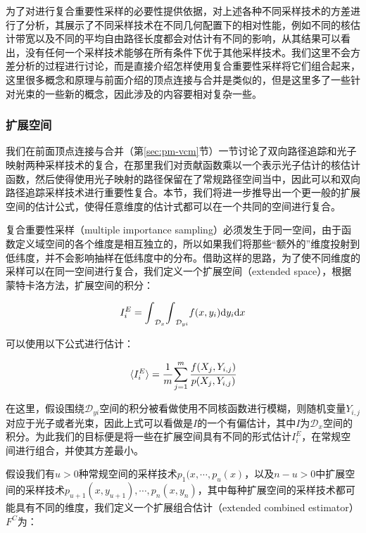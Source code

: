 为了对进行复合重要性采样的必要性提供依据，\cite{a:UnifyingPointsBeamsandPathsinVolumetricLightTransportSimulation}对上述各种不同采样技术的方差进行了分析，其展示了不同采样技术在不同几何配置下的相对性能，例如不同的核估计带宽以及不同的平均自由路径长度都会对估计有不同的影响，从其结果可以看出，没有任何一个采样技术能够在所有条件下优于其他采样技术。我们这里不会方差分析的过程进行讨论，而是直接介绍怎样使用复合重要性采样将它们组合起来，这里很多概念和原理与前面介绍的顶点连接与合并是类似的，但是这里多了一些针对光束的一些新的概念，因此涉及的内容要相对复杂一些。




\subsubsection{扩展空间}
我们在前面顶点连接与合并（第\ref{sec:pm-vcm}节）一节讨论了双向路径追踪和光子映射两种采样技术的复合，在那里我们对贡献函数乘以一个表示光子估计的核估计函数，然后使得使用光子映射的路径保留在了常规路径空间当中，因此可以和双向路径追踪采样技术进行重要性复合。本节，我们将进一步推导出一个更一般的扩展空间的估计公式，使得任意维度的估计式都可以在一个共同的空间进行复合。

复合重要性采样（multiple importance sampling）必须发生于同一空间，由于函数定义域空间的各个维度是相互独立的，所以如果我们将那些“额外的”维度投射到低纬度，并不会影响抽样在低纬度中的分布。借助这样的思路，为了使不同维度的采样可以在同一空间进行复合，我们定义一个扩展空间（extended space），根据蒙特卡洛方法，扩展空间的积分：

\begin{equation}
	I^{E}_i={\rm \int}_{\mathcal{D}_x}{\rm \int}_{\mathcal{D}_{yi}}f(x,y_i){\rm d}y_i{\rm d}x	
\end{equation}

\noindent 可以使用以下公式进行估计：

\begin{equation}
	\langle I^{E}_i\rangle= \cfrac{1}{m}\sum^{m}_{j=1} \cfrac{f(X_j,Y_{i,j})}{p(X_j,Y_{i,j})}
\end{equation}

\noindent 在这里，假设围绕$\mathcal{D}_{yi}$空间的积分被看做使用不同核函数进行模糊，则随机变量$Y_{i,j}$对应于光子或者光束，因此上式可以看做是$I$的一个有偏估计，其中$I$为$\mathcal{D}_x$空间的积分。为此我们的目标便是将一些在扩展空间具有不同的形式估计$I^{E}_i$，在常规空间进行组合，并使其方差最小。

假设我们有$u>0$种常规空间的采样技术$p_1(x,\cdots,p_u(x)$，以及$n-u>0$中扩展空间的采样技术$p_{u+1}(x,y_{u+1}),\cdots,p_n(x,y_n)$，其中每种扩展空间的采样技术都可能具有不同的维度，我们定义一个扩展组合估计（extended combined estimator）$F^{C}$为：

